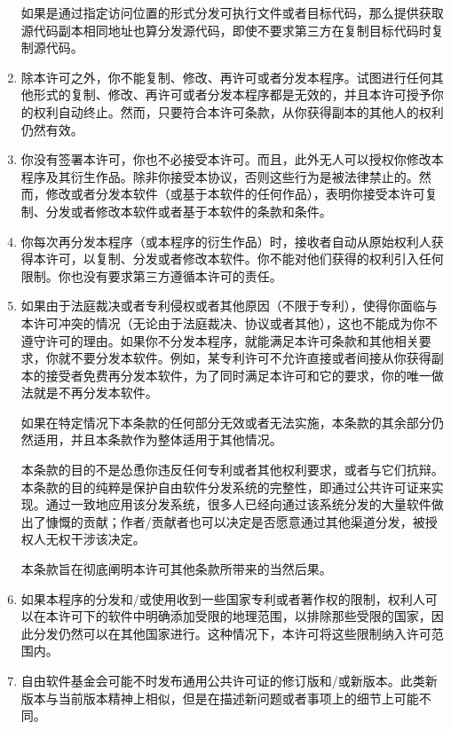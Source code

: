 \documentclass[11pt]{article}
\begin{document}
\begin{enumerate}
如果是通过指定访问位置的形式分发可执行文件或者目标代码，那么提供获取源代码副本相同地址也算分发源代码，即使不要求第三方在复制目标代码时复制源代码。

\item
除本许可之外，你不能复制、修改、再许可或者分发本程序。试图进行任何其他形式的复制、修改、再许可或者分发本程序都是无效的，并且本许可授予你的权利自动终止。然而，只要符合本许可条款，从你获得副本的其他人的权利仍然有效。

\item
你没有签署本许可，你也不必接受本许可。而且，此外无人可以授权你修改本程序及其衍生作品。除非你接受本协议，否则这些行为是被法律禁止的。然而，修改或者分发本软件（或基于本软件的任何作品），表明你接受本许可复制、分发或者修改本软件或者基于本软件的条款和条件。

\item
你每次再分发本程序（或本程序的衍生作品）时，接收者自动从原始权利人获得本许可，以复制、分发或者修改本软件。你不能对他们获得的权利引入任何限制。你也没有要求第三方遵循本许可的责任。

\item
如果由于法庭裁决或者专利侵权或者其他原因（不限于专利），使得你面临与本许可冲突的情况（无论由于法庭裁决、协议或者其他），这也不能成为你不遵守许可的理由。如果你不分发本程序，就能满足本许可条款和其他相关要求，你就不要分发本软件。例如，某专利许可不允许直接或者间接从你获得副本的接受者免费再分发本软件，为了同时满足本许可和它的要求，你的唯一做法就是不再分发本软件。

如果在特定情况下本条款的任何部分无效或者无法实施，本条款的其余部分仍然适用，并且本条款作为整体适用于其他情况。

本条款的目的不是怂恿你违反任何专利或者其他权利要求，或者与它们抗辩。本条款的目的纯粹是保护自由软件分发系统的完整性，即通过公共许可证来实现。通过一致地应用该分发系统，很多人已经向通过该系统分发的大量软件做出了慷慨的贡献；作者/贡献者也可以决定是否愿意通过其他渠道分发，被授权人无权干涉该决定。

本条款旨在彻底阐明本许可其他条款所带来的当然后果。

\item
如果本程序的分发和/或使用收到一些国家专利或者著作权的限制，权利人可以在本许可下的软件中明确添加受限的地理范围，以排除那些受限的国家，因此分发仍然可以在其他国家进行。这种情况下，本许可将这些限制纳入许可范围内。

\item
自由软件基金会可能不时发布通用公共许可证的修订版和/或新版本。此类新版本与当前版本精神上相似，但是在描述新问题或者事项上的细节上可能不同。


\end{enumerate}
\end{document}
